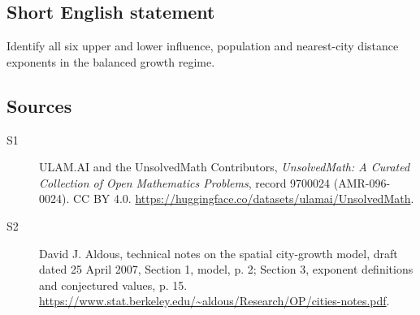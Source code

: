 \documentclass[11pt]{article}
\begin{document}
\subsection{Short English statement}
Identify all six upper and lower influence, population and nearest-city distance exponents in the balanced growth regime.
\subsection{Sources}
\begin{description}
\item[\hypertarget{source:9700024:1}{S1}] ULAM.AI and the UnsolvedMath Contributors, \emph{UnsolvedMath: A Curated Collection of Open Mathematics Problems}, record 9700024 (AMR-096-0024). CC BY 4.0. \url{https://huggingface.co/datasets/ulamai/UnsolvedMath}.
\item[\hypertarget{source:9700024:2}{S2}] David J. Aldous, technical notes on the spatial city-growth model, draft dated 25 April 2007, Section 1, model, p. 2; Section 3, exponent definitions and conjectured values, p. 15. \url{https://www.stat.berkeley.edu/~aldous/Research/OP/cities-notes.pdf}.
\end{description}
\label{end:9700024}
\end{document}
